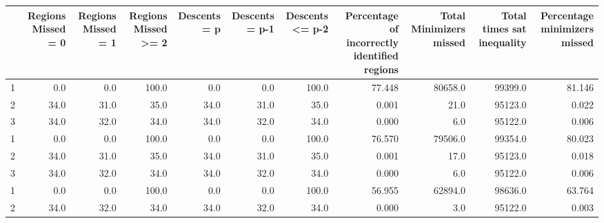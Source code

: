 \begin{tabular}{lrrrrrrrrrr}
\toprule
{} &  Regions Missed = 0 &  Regions Missed = 1 &  Regions Missed >= 2 &  Descents = p &  Descents = p-1 &  Descents <= p-2 &  Percentage of incorrectly identified regions &  Total Minimizers missed &  Total times sat inequality &  Percentage minimizers missed \\
\midrule
1 &                 0.0 &                 0.0 &                100.0 &           0.0 &             0.0 &            100.0 &                                        77.448 &                  80658.0 &                     99399.0 &                        81.146 \\
2 &                34.0 &                31.0 &                 35.0 &          34.0 &            31.0 &             35.0 &                                         0.001 &                     21.0 &                     95123.0 &                         0.022 \\
3 &                34.0 &                32.0 &                 34.0 &          34.0 &            32.0 &             34.0 &                                         0.000 &                      6.0 &                     95122.0 &                         0.006 \\
1 &                 0.0 &                 0.0 &                100.0 &           0.0 &             0.0 &            100.0 &                                        76.570 &                  79506.0 &                     99354.0 &                        80.023 \\
2 &                34.0 &                31.0 &                 35.0 &          34.0 &            31.0 &             35.0 &                                         0.001 &                     17.0 &                     95123.0 &                         0.018 \\
3 &                34.0 &                32.0 &                 34.0 &          34.0 &            32.0 &             34.0 &                                         0.000 &                      6.0 &                     95122.0 &                         0.006 \\
1 &                 0.0 &                 0.0 &                100.0 &           0.0 &             0.0 &            100.0 &                                        56.955 &                  62894.0 &                     98636.0 &                        63.764 \\
2 &                34.0 &                32.0 &                 34.0 &          34.0 &            32.0 &             34.0 &                                         0.000 &                      3.0 &                     95122.0 &                         0.003 \\

\end{tabular}
